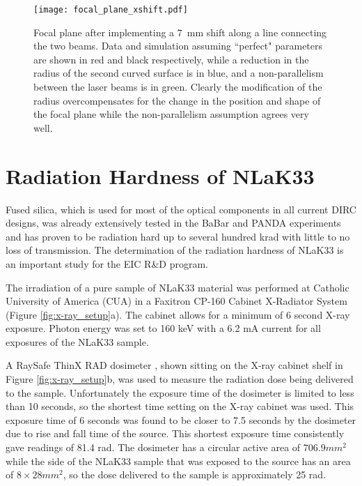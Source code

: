 \begin{figure}[!htb]
	\centering
	\texttt{[image: focal\_plane\_xshift.pdf]}
	\caption[Focal plane after implementing a $7$~mm shift along a line connecting the two beams.]{Focal plane after implementing a $7$~mm shift along a line connecting the two beams. Data and simulation assuming ``perfect" parameters are shown in red and black respectively, while a reduction in the radius of the second curved surface is in blue, and a non-parallelism between the laser beams is in green. Clearly the modification of the radius overcompensates for the change in the position and shape of the focal plane while the non-parallelism assumption agrees very well.}
	\label{fig:focal_plane_xshift}
\end{figure}


\clearpage
\section{Radiation Hardness of NLaK33}
Fused silica, which is used for most of the optical components in all current DIRC designs, was already extensively tested in the BaBar and PANDA experiments \cite{RadHardness} and has proven to be radiation hard up to several hundred krad with little to no loss of transmission. The determination of the radiation hardness of NLaK33 is an important study for the EIC R\&D program. 

The irradiation of a pure sample of NLaK33 material was performed at Catholic University of America (CUA) in a Faxitron CP-160 Cabinet X-Radiator System \cite{XRayCabinet} (Figure \ref{fig:x-ray_setup}a). The cabinet allows for a minimum of 6 second X-ray exposure. Photon energy was set to 160 keV with a 6.2 mA current for all exposures of the NLaK33 sample.

A RaySafe ThinX RAD dosimeter \cite{Dosimeter}, shown sitting on the X-ray cabinet shelf in Figure \ref{fig:x-ray_setup}b, was used to measure the radiation dose being delivered to the sample. Unfortunately the exposure time of the dosimeter is limited to less than 10 seconds, so the shortest time setting on the X-ray cabinet was used. This exposure time of 6 seconds was found to be closer to 7.5 seconds by the dosimeter due to rise and fall time of the source. This shortest exposure time consistently gave readings of 81.4 rad. The dosimeter has a circular active area of $706.9\unit{mm}^2$ while the side of the NLaK33 sample that was exposed to the source has an area of $8\times28\unit{mm}^2$, so the dose delivered to the sample is approximately 25 rad.


